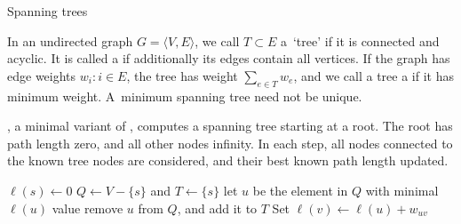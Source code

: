 

 {Spanning trees}

In an undirected graph $G=\langle V,E\rangle$, we call $T\subset E$ a~`tree'
if it is connected and acyclic. It is called a 
if additionally its edges contain all vertices.
If the graph has edge weights
$w_i\colon i\in E$, the tree has weight $\sum_{e\in T} w_e$, and
we call a tree a  if it has minimum weight.
A~minimum spanning tree need not be unique.

, a minimal variant of
, computes a spanning
tree starting at a root. The root has path length zero, and all other
nodes infinity.  In each step, all nodes connected to the known tree
nodes are considered, and their best known path length updated.

\begin{displayalgorithm}
  $\ell(s)\leftarrow 0$\;
  $Q\leftarrow V-\{s\}$ and $T\leftarrow \{s\}$\;
   {
    let $u$ be the element in $Q$ with minimal $\ell(u)$ value\;
    remove $u$ from $Q$, and add it to $T$\;
     {
       {Set $\ell(v)\leftarrow \ell(u)+w_{uv}$}
    }
  }
\end{displayalgorithm}

